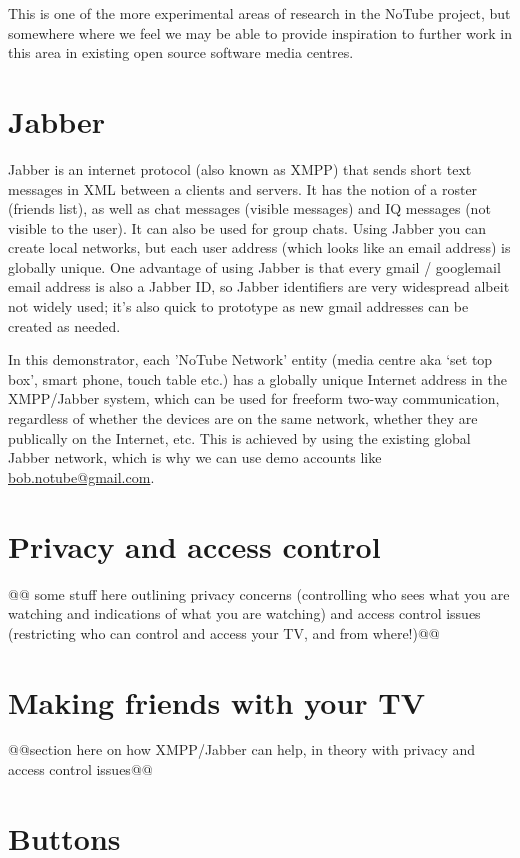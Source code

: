 \documentclass[]{article}
\begin{document}
This is one of the more experimental areas of research in the NoTube project, but somewhere where we feel we may be able to provide inspiration to further work in this area in existing open source software media centres.

\section{Jabber}

Jabber is an internet protocol (also known as XMPP) that sends short text messages in XML between a clients and servers. It has the notion of a roster (friends list), as well as chat messages (visible messages) and IQ messages (not visible to the user). It can also be used for group chats. Using Jabber you can create local networks, but each user address (which looks like an email address) is globally unique. One advantage of using Jabber is that every gmail / googlemail email address is also a Jabber ID, so Jabber identifiers are very widespread albeit not widely used; it's also quick to prototype as new gmail addresses can be created as needed. 

In this demonstrator, each 'NoTube Network' entity (media centre aka `set top box', smart phone, touch table etc.) has a globally unique Internet address in the XMPP/Jabber system, which can be used for freeform two-way communication, regardless of whether the devices are on the same network, whether they are publically on the Internet, etc. This is achieved by using the existing global Jabber network, which is why we can use demo accounts like \url{bob.notube@gmail.com}.


\section{Privacy and access control}

@@ some stuff here outlining privacy concerns (controlling who sees what you are watching and indications of what you are watching) and access control issues (restricting who can control and access your TV, and from where!)@@

\section{Making friends with your TV}

@@section here on how XMPP/Jabber can help, in theory with privacy and access control issues@@

\section{Buttons}
\end{document}
